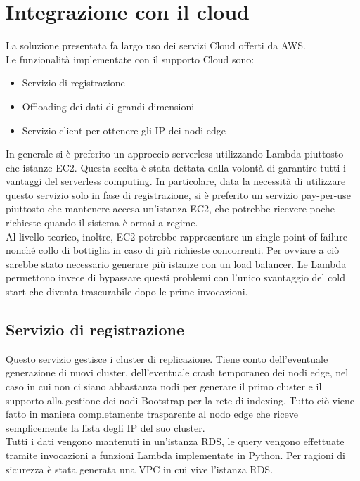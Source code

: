 \documentclass[conference]{IEEEtran}
\begin{document}
\section{Integrazione con il cloud}
La soluzione presentata fa largo uso dei servizi Cloud offerti da AWS.\\Le funzionalità implementate con il supporto Cloud
sono:
\begin{itemize}
  \item{Servizio di registrazione}
  \item{Offloading dei dati di grandi dimensioni}
  \item{Servizio client per ottenere gli IP dei nodi edge}
\end{itemize}

In generale si è preferito un approccio serverless utilizzando Lambda piuttosto che istanze EC2. Questa scelta è stata dettata
dalla volontà di garantire tutti i vantaggi del serverless computing. In particolare, data la necessità di utilizzare questo servizio solo
in fase di registrazione, si è preferito un servizio pay-per-use piuttosto che mantenere accesa un'istanza EC2, che potrebbe
ricevere poche richieste quando il sistema è ormai a regime.\\
Al livello teorico, inoltre, EC2 potrebbe rappresentare un single point of failure nonché collo di bottiglia in caso di più
richieste concorrenti. Per ovviare a ciò sarebbe stato necessario generare più istanze con un load balancer.
Le Lambda permettono invece di bypassare questi problemi con l'unico svantaggio del cold start che diventa trascurabile
dopo le prime invocazioni.

\subsection{Servizio di registrazione}
Questo servizio gestisce i cluster di replicazione. Tiene conto dell'eventuale generazione di nuovi cluster, dell'eventuale
crash temporaneo dei nodi edge, nel caso in cui non ci siano abbastanza nodi per generare il primo cluster e il supporto alla
gestione dei nodi Bootstrap per la rete di indexing. Tutto ciò viene fatto in maniera completamente trasparente al nodo edge che riceve semplicemente la lista
degli IP del suo cluster.\\
Tutti i dati vengono mantenuti in un'istanza RDS, le query vengono effettuate tramite invocazioni a funzioni Lambda implementate
in Python. Per ragioni di sicurezza è stata generata una VPC in cui vive l'istanza RDS.
\end{document}
